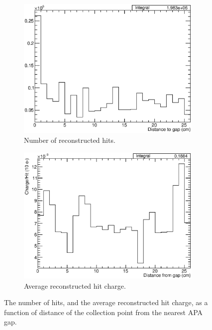 \begin{figure}
  \centering
  \begin{subfigure}[t]{0.48\linewidth}
    \centering
    \includegraphics[width=0.98\textwidth]{HitGapDistance.eps}
    \caption{Number of reconstructed hits.}
    \label{fig:HitGapDistanceNum}
  \end{subfigure}
  \hfill
  \begin{subfigure}[t]{0.48\linewidth}
    \centering
    \includegraphics[width=0.98\textwidth]{ChargeHit.eps}
    \caption{Average reconstructed hit charge.}
    \label{fig:HitGapDistanceCharge}
  \end{subfigure}
  \caption[The number of hits, and the average reconstructed hit charge, as a function of distance of the collection point from the nearest APA gap.]{The number of hits, and the average reconstructed hit charge, as a function of distance of the collection point from the nearest APA gap.}
  \label{fig:HitGapDistance}
\end{figure}

